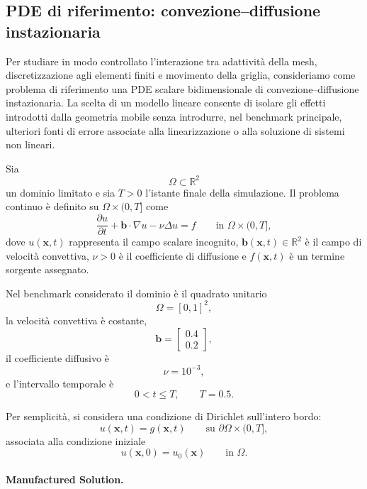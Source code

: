 \subsection{PDE di riferimento: convezione--diffusione instazionaria}
\label{subsec:pde_governing}

Per studiare in modo controllato l'interazione tra adattività della mesh, discretizzazione agli elementi finiti e movimento della griglia, consideriamo come problema di riferimento una PDE scalare bidimensionale di convezione--diffusione instazionaria. La scelta di un modello lineare consente di isolare gli effetti introdotti dalla geometria mobile senza introdurre, nel benchmark principale, ulteriori fonti di errore associate alla linearizzazione o alla soluzione di sistemi non lineari.

Sia
\[
\Omega \subset \mathbb{R}^2
\]
un dominio limitato e sia $T>0$ l'istante finale della simulazione. Il problema continuo è definito su $\Omega\times(0,T]$ come
\begin{equation}
\frac{\partial u}{\partial t}
+
\mathbf{b}\cdot\nabla u
-
\nu \Delta u
=
f
\qquad
\text{in } \Omega\times(0,T],
\label{eq:governing_pde}
\end{equation}
dove $u(\mathbf{x},t)$ rappresenta il campo scalare incognito, $\mathbf{b}(\mathbf{x},t)\in\mathbb{R}^2$ è il campo di velocità convettiva, $\nu>0$ è il coefficiente di diffusione e $f(\mathbf{x},t)$ è un termine sorgente assegnato.

Nel benchmark considerato il dominio è il quadrato unitario
\[
\Omega=[0,1]^2,
\]
la velocità convettiva è costante,
\[
\mathbf{b}=
\begin{bmatrix}
0.4\\
0.2
\end{bmatrix},
\]
il coefficiente diffusivo è
\[
\nu=10^{-3},
\]
e l'intervallo temporale è
\[
0<t\leq T,
\qquad
T=0.5.
\]

Per semplicità, si considera una condizione di Dirichlet sull'intero bordo:
\begin{equation}
u(\mathbf{x},t)=g(\mathbf{x},t)
\qquad
\text{su } \partial\Omega\times(0,T],
\label{eq:dirichlet_bc}
\end{equation}
associata alla condizione iniziale
\begin{equation}
u(\mathbf{x},0)=u_0(\mathbf{x})
\qquad
\text{in } \Omega.
\label{eq:initial_condition}
\end{equation}

\paragraph{Manufactured Solution.}

